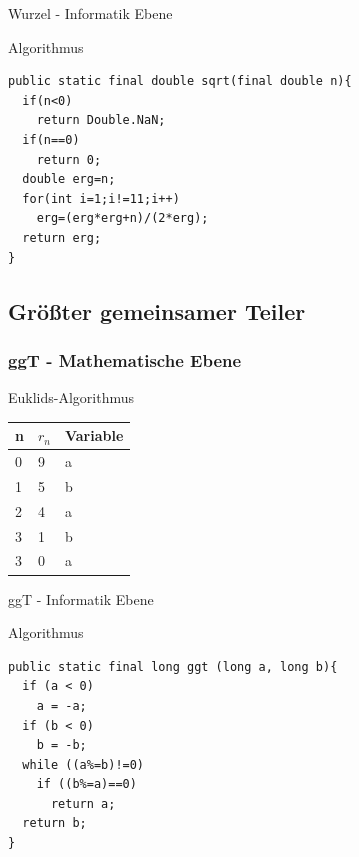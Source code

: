 \documentclass{beamer}
\begin{document}
\begin{frame}[fragile]{Wurzel - Informatik Ebene}
	\begin{exampleblock}{Algorithmus}
		\begin{lstlisting}
public static final double sqrt(final double n){
  if(n<0)
    return Double.NaN;
  if(n==0)
    return 0;
  double erg=n;
  for(int i=1;i!=11;i++)
    erg=(erg*erg+n)/(2*erg);
  return erg;        
}
		\end{lstlisting}
	\end{exampleblock}
\end{frame}

\subsection{Gr\"o\ss{}ter gemeinsamer Teiler}
\begin{frame}\frametitle{ggT - Mathematische Ebene} 
Euklids-Algorithmus\newline
\begin{tabular}[b]{|l|l|l|}
\hline
n & \(r_n\) & Variable\\
\hline\hline
0 & 9 & a\\
\hline
1 & 5 & b\\
\hline
2 & 4 & a\\
\hline
3 & 1 & b\\
\hline
3 & 0 & a\\
\hline
\end{tabular}
\end{frame}

\begin{frame}[fragile]{ggT - Informatik Ebene}
	\begin{exampleblock}{Algorithmus}
		\begin{lstlisting}
public static final long ggt (long a, long b){
  if (a < 0)
    a = -a;
  if (b < 0)
    b = -b;
  while ((a%=b)!=0)
    if ((b%=a)==0)
      return a;
  return b;
}
		\end{lstlisting}
	\end{exampleblock}
\end{frame}
\end{document}
